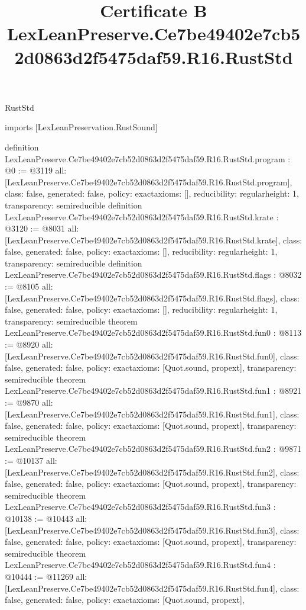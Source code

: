 \begin{lexlean}{RustStd}
\title{Certificate B LexLeanPreserve.Ce7be49402e7cb52d0863d2f5475daf59.R16.RustStd}
\begin{coremodule}
imports [LexLeanPreservation.RustSound]

definition LexLeanPreserve.Ce7be49402e7cb52d0863d2f5475daf59.R16.RustStd.program : @0 := @3119 {
  all: [LexLeanPreserve.Ce7be49402e7cb52d0863d2f5475daf59.R16.RustStd.program],
  class: false,
  generated: false,
  policy: exact{axioms: []},
  reducibility: regular{height: 1},
  transparency: semireducible
}
definition LexLeanPreserve.Ce7be49402e7cb52d0863d2f5475daf59.R16.RustStd.krate : @3120 := @8031 {
  all: [LexLeanPreserve.Ce7be49402e7cb52d0863d2f5475daf59.R16.RustStd.krate],
  class: false,
  generated: false,
  policy: exact{axioms: []},
  reducibility: regular{height: 1},
  transparency: semireducible
}
definition LexLeanPreserve.Ce7be49402e7cb52d0863d2f5475daf59.R16.RustStd.flags : @8032 := @8105 {
  all: [LexLeanPreserve.Ce7be49402e7cb52d0863d2f5475daf59.R16.RustStd.flags],
  class: false,
  generated: false,
  policy: exact{axioms: []},
  reducibility: regular{height: 1},
  transparency: semireducible
}
theorem LexLeanPreserve.Ce7be49402e7cb52d0863d2f5475daf59.R16.RustStd.fun0 : @8113 := @8920 {
  all: [LexLeanPreserve.Ce7be49402e7cb52d0863d2f5475daf59.R16.RustStd.fun0],
  class: false,
  generated: false,
  policy: exact{axioms: [Quot.sound, propext]},
  transparency: semireducible
}
theorem LexLeanPreserve.Ce7be49402e7cb52d0863d2f5475daf59.R16.RustStd.fun1 : @8921 := @9870 {
  all: [LexLeanPreserve.Ce7be49402e7cb52d0863d2f5475daf59.R16.RustStd.fun1],
  class: false,
  generated: false,
  policy: exact{axioms: [Quot.sound, propext]},
  transparency: semireducible
}
theorem LexLeanPreserve.Ce7be49402e7cb52d0863d2f5475daf59.R16.RustStd.fun2 : @9871 := @10137 {
  all: [LexLeanPreserve.Ce7be49402e7cb52d0863d2f5475daf59.R16.RustStd.fun2],
  class: false,
  generated: false,
  policy: exact{axioms: [Quot.sound, propext]},
  transparency: semireducible
}
theorem LexLeanPreserve.Ce7be49402e7cb52d0863d2f5475daf59.R16.RustStd.fun3 : @10138 := @10443 {
  all: [LexLeanPreserve.Ce7be49402e7cb52d0863d2f5475daf59.R16.RustStd.fun3],
  class: false,
  generated: false,
  policy: exact{axioms: [Quot.sound, propext]},
  transparency: semireducible
}
theorem LexLeanPreserve.Ce7be49402e7cb52d0863d2f5475daf59.R16.RustStd.fun4 : @10444 := @11269 {
  all: [LexLeanPreserve.Ce7be49402e7cb52d0863d2f5475daf59.R16.RustStd.fun4],
  class: false,
  generated: false,
  policy: exact{axioms: [Quot.sound, propext]},
}
\end{coremodule}
\end{lexlean}
